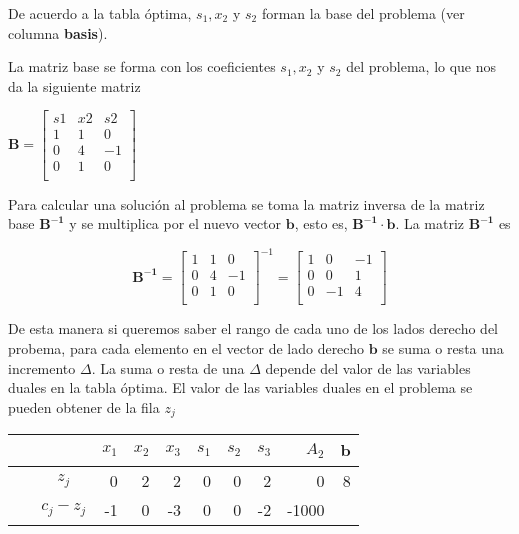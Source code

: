 \begin{solution}
  De acuerdo a la tabla óptima, $s_1, x_2$ y $s_2$ forman la base del problema (ver columna \textbf{basis}). 

  La matriz base se forma con los coeficientes $s_1, x_2$ y $s_2$ del problema, lo que nos da la siguiente matriz

  $\boldsymbol{B} = %
  \begin{bmatrix}
    s1& x2& s2\\
    1& 1& 0\\
    0& 4& -1\\
    0& 1& 0\\
  \end{bmatrix}
  $  

  Para calcular una solución al problema se toma la matriz inversa de la matriz base $\boldsymbol{B^{-1}}$ y se multiplica por el nuevo vector $\boldsymbol{b}$, esto es, $\boldsymbol{B^{-1}}\cdot \boldsymbol{b}$. La matriz $\boldsymbol{B^{-1}}$ es

  \[ \boldsymbol{B^{-1}} =%
    \begin{bmatrix}
    1& 1& 0\\
    0& 4& -1\\
    0& 1& 0\\
  \end{bmatrix}^{-1} =%
    \begin{bmatrix}
      1& 0& -1\\
      0& 0& 1\\
      0& -1& 4\\
    \end{bmatrix}
  \]

  
  De esta manera si queremos saber el rango de cada uno de los lados derecho del probema, para cada elemento en el vector de lado derecho $\boldsymbol{b}$ se suma o resta una incremento $\Delta$. La suma o resta de una $\Delta$ depende del valor de las variables duales en la tabla óptima. El valor
  de las variables duales en el problema se pueden obtener de la fila $z_j$

  {    \centering
    \begin{tabular}{lcrrrrrrrr}
      ~ & ~ & $x_1$ & $x_2$ & $x_3$ & $s_1$ & $s_2$ & $s_3$ & $A_2$ & $\boldsymbol{b}$ \\ \midrule
\toprule
          ~ & $z_j$ & 0 & 2 & 2 & \cellcolor{yellow}0 & \cellcolor{yellow}0 & \cellcolor{yellow}2 & 0 & \cellcolor{green}8 \\ 
      ~ & $c_j - z_j$ & -1 & 0 & -3 & 0 & 0 & -2 & -1000 \\ \toprule
    \end{tabular}\par}


\end{solution}
